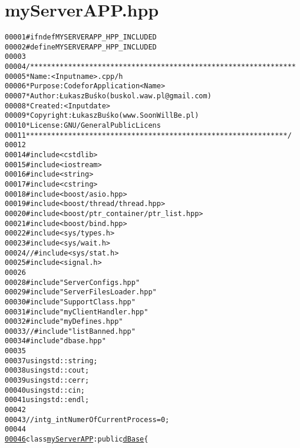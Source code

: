 \hypertarget{myServerAPP_8hpp_source}{
\section{myServerAPP.hpp}
}


\begin{footnotesize}\begin{alltt}
00001 \textcolor{preprocessor}{#ifndef MYSERVERAPP\_HPP\_INCLUDED}
00002 \textcolor{preprocessor}{}\textcolor{preprocessor}{#define MYSERVERAPP\_HPP\_INCLUDED}
00003 \textcolor{preprocessor}{}
00004 \textcolor{comment}{/***************************************************************}
00005 \textcolor{comment}{ * Name:      <Input name>.cpp/h}
00006 \textcolor{comment}{ * Purpose:   Code for Application <Name>}
00007 \textcolor{comment}{ * Author:    Łukasz Buśko (buskol.waw.pl@gmail.com)}
00008 \textcolor{comment}{ * Created:   <Input date>}
00009 \textcolor{comment}{ * Copyright: Łukasz Buśko (www.SoonWillBe.pl)}
00010 \textcolor{comment}{ * License:   GNU / General Public Licens}
00011 \textcolor{comment}{ **************************************************************/}
00012 
00014 \textcolor{preprocessor}{#include <cstdlib>}
00015 \textcolor{preprocessor}{#include <iostream>}
00016 \textcolor{preprocessor}{#include <string>}
00017 \textcolor{preprocessor}{#include <cstring>}
00018 \textcolor{preprocessor}{#include <boost/asio.hpp>}
00019 \textcolor{preprocessor}{#include <boost/thread/thread.hpp>}
00020 \textcolor{preprocessor}{#include <boost/ptr\_container/ptr\_list.hpp>}
00021 \textcolor{preprocessor}{#include <boost/bind.hpp>}
00022 \textcolor{preprocessor}{#include <sys/types.h>}
00023 \textcolor{preprocessor}{#include <sys/wait.h>}
00024 \textcolor{comment}{//#include <sys/stat.h>}
00025 \textcolor{preprocessor}{#include <signal.h>}
00026 
00028 \textcolor{preprocessor}{#include "ServerConfigs.hpp"}
00029 \textcolor{preprocessor}{#include "ServerFilesLoader.hpp"}
00030 \textcolor{preprocessor}{#include "SupportClass.hpp"}
00031 \textcolor{preprocessor}{#include "myClientHandler.hpp"}
00032 \textcolor{preprocessor}{#include "myDefines.hpp"}
00033 \textcolor{comment}{//#include "listBanned.hpp"}
00034 \textcolor{preprocessor}{#include "dbase.hpp"}
00035 
00037 \textcolor{keyword}{using} std::string;
00038 \textcolor{keyword}{using} std::cout;
00039 \textcolor{keyword}{using} std::cerr;
00040 \textcolor{keyword}{using} std::cin;
00041 \textcolor{keyword}{using} std::endl;
00042 
00043 \textcolor{comment}{//int g\_intNumerOfCurrentProcess = 0;}
00044 
\hypertarget{myServerAPP_8hpp_source_l00046}{}\hyperlink{classmyServerAPP}{00046} \textcolor{keyword}{class }\hyperlink{classmyServerAPP}{myServerAPP}:\textcolor{keyword}{public} \hyperlink{classdBase}{dBase}\{

\end{alltt}
\end{footnotesize}
